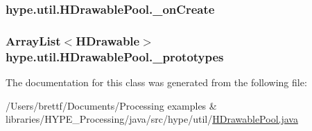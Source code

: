 \hypertarget{classhype_1_1util_1_1_h_drawable_pool_acd09bbc8813c3fab35dd5495ba443873}{
\subsubsection[{\-\_\-on\-Create}]{ hype.\-util.\-H\-Drawable\-Pool.\-\_\-on\-Create}}\label{classhype_1_1util_1_1_h_drawable_pool_acd09bbc8813c3fab35dd5495ba443873}
\hypertarget{classhype_1_1util_1_1_h_drawable_pool_a7146e4d423fde5a2a163c7d2840790bc}{
\subsubsection[{\-\_\-prototypes}]{\setlength{\rightskip}{0pt plus 5cm}Array\-List$<${\bf H\-Drawable}$>$ hype.\-util.\-H\-Drawable\-Pool.\-\_\-prototypes\hspace{0.3cm}{\ttfamily [protected]}}}\label{classhype_1_1util_1_1_h_drawable_pool_a7146e4d423fde5a2a163c7d2840790bc}


The documentation for this class was generated from the following file\-:\begin{DoxyCompactItemize}
\item 
/\-Users/brettf/\-Documents/\-Processing examples \& libraries/\-H\-Y\-P\-E\-\_\-\-Processing/java/src/hype/util/\hyperlink{_h_drawable_pool_8java}{H\-Drawable\-Pool.\-java}\end{DoxyCompactItemize}
